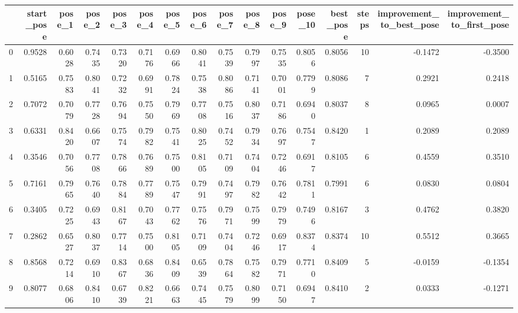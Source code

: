 \begin{tabular}{lrrrrrrrrrrrrrrr}
\toprule
{} &  start\_pose &  pose\_1 &  pose\_2 &  pose\_3 &  pose\_4 &  pose\_5 &  pose\_6 &  pose\_7 &  pose\_8 &  pose\_9 &  pose\_10 &  best\_pose &  steps &  improvement\_to\_best\_pose &  improvement\_to\_first\_pose \\
\midrule
0  &      0.9528 &  0.6028 &  0.7435 &  0.7320 &  0.7176 &  0.6966 &  0.8041 &  0.7539 &  0.7997 &  0.7535 &   0.8056 &     0.8056 &     10 &                   -0.1472 &                    -0.3500 \\
1  &      0.5165 &  0.7583 &  0.8041 &  0.7232 &  0.6991 &  0.7824 &  0.7538 &  0.8086 &  0.7141 &  0.7001 &   0.7799 &     0.8086 &      7 &                    0.2921 &                     0.2418 \\
2  &      0.7072 &  0.7079 &  0.7728 &  0.7694 &  0.7550 &  0.7969 &  0.7708 &  0.7516 &  0.8037 &  0.7186 &   0.6940 &     0.8037 &      8 &                    0.0965 &                     0.0007 \\
3  &      0.6331 &  0.8420 &  0.6607 &  0.7574 &  0.7982 &  0.7541 &  0.8025 &  0.7452 &  0.7934 &  0.7697 &   0.7547 &     0.8420 &      1 &                    0.2089 &                     0.2089 \\
4  &      0.3546 &  0.7056 &  0.7708 &  0.7866 &  0.7689 &  0.7500 &  0.8105 &  0.7109 &  0.7404 &  0.7246 &   0.6917 &     0.8105 &      6 &                    0.4559 &                     0.3510 \\
5  &      0.7161 &  0.7965 &  0.7640 &  0.7884 &  0.7789 &  0.7547 &  0.7991 &  0.7497 &  0.7982 &  0.7642 &   0.7811 &     0.7991 &      6 &                    0.0830 &                     0.0804 \\
6  &      0.3405 &  0.7225 &  0.6943 &  0.8167 &  0.7043 &  0.7762 &  0.7576 &  0.7971 &  0.7599 &  0.7979 &   0.7496 &     0.8167 &      3 &                    0.4762 &                     0.3820 \\
7  &      0.2862 &  0.6527 &  0.8037 &  0.7714 &  0.7500 &  0.8105 &  0.7109 &  0.7404 &  0.7246 &  0.6917 &   0.8374 &     0.8374 &     10 &                    0.5512 &                     0.3665 \\
8  &      0.8568 &  0.7214 &  0.6910 &  0.8367 &  0.6836 &  0.8409 &  0.6539 &  0.7864 &  0.7582 &  0.7971 &   0.7710 &     0.8409 &      5 &                   -0.0159 &                    -0.1354 \\
9  &      0.8077 &  0.6806 &  0.8410 &  0.6739 &  0.8221 &  0.6663 &  0.7445 &  0.7579 &  0.8099 &  0.7150 &   0.6947 &     0.8410 &      2 &                    0.0333 &                    -0.1271 \\

\end{tabular}
